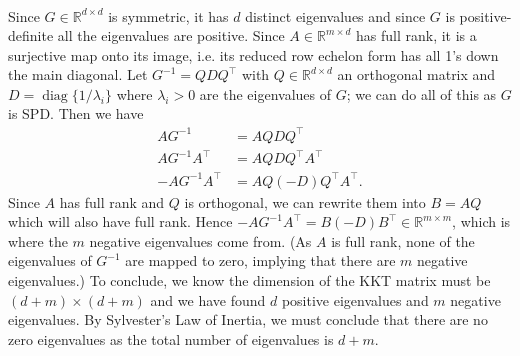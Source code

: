 \documentclass{letter}
\newcommand{\T}{\intercal}
\DeclareMathOperator{\diag}{diag}
\begin{document}
{\begin{align*}
    \end{align*} Since $G \in \mathbb{R}^{d\times d}$ is symmetric, it has $d$ distinct eigenvalues and since $G$ is positive-definite all the eigenvalues are positive. Since $A \in \mathbb{R}^{m\times d}$ has full rank, it is a surjective map onto its image, i.e. its reduced row echelon form has all 1's down the main diagonal. Let $G^{-1} = QDQ^\T$ with $Q \in \mathbb{R}^{d\times d}$ an orthogonal matrix and $D = \diag\{1/\lambda_i\}$ where $\lambda_i > 0$ are the eigenvalues of $G$; we can do all of this as $G$ is SPD. Then we have \begin{align*}
        AG^{-1} &= AQDQ^\T \\
        AG^{-1}A^\T &= AQDQ^\T A^\T \\
        -AG^{-1}A^\T &= AQ(-D)Q^\T A^\T.
    \end{align*} Since $A$ has full rank and $Q$ is orthogonal, we can rewrite them into $B = AQ$ which will also have full rank. Hence $-AG^{-1}A^\T = B(-D)B^\T \in \mathbb{R}^{m \times m}$, which is where the $m$ negative eigenvalues come from. (As $A$ is full rank, none of the eigenvalues of $G^{-1}$ are mapped to zero, implying that there are $m$ negative eigenvalues.) To conclude, we know the dimension of the KKT matrix must be $(d+m) \times (d+m)$ and we have found $d$ positive eigenvalues and $m$ negative eigenvalues. By Sylvester's Law of Inertia, we must conclude that there are no zero eigenvalues as the total number of eigenvalues is $d+m$.}
\end{document}
